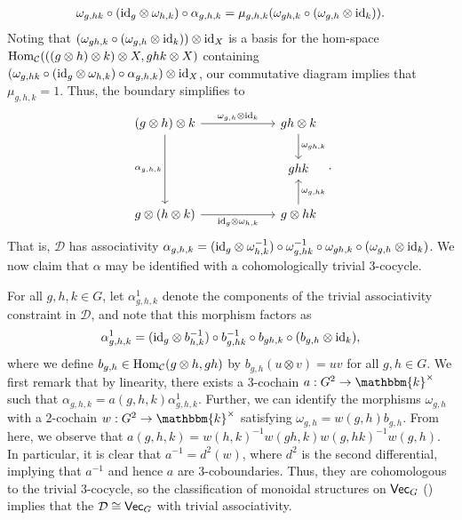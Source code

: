 \documentclass[12pt, reqno]{amsart}
\numberwithin{equation}{section}
\theoremstyle{plainspace}
\theoremstyle{definitionspace}
\theoremstyle{remarkspace}
\renewenvironment{proof}{{\noindent\textbf{Proof.}}}{\null\hfill\qedsymbol}
\newcommand{\id}{\textup{id}}
\newcommand{\mathcat}[1]{\mathcal{#1}}
\newcommand{\Hom}[2][]{
	\ifthenelse{\equal{#2}{}}
		{\textup{Hom}_{#1}}
		{\textup{Hom}_{#1}\!\left(#2\right)}
}
\newcommand{\textcat}[1]{\textup{\textsf{#1}}}
\begin{document}
\begin{proof}
\begin{align*}
\begin{split}
\omega_{g,hk} \circ (\id_g \otimes \omega_{h,k}) \circ \alpha_{g,h,k} = \mu_{g,h,k}(\omega_{gh,k} \circ (\omega_{g,h} \otimes \id_k)).
\end{split}
\end{align*}
\noindent Noting that $(\omega_{gh,k} \circ (\omega_{g,h} \otimes \id_k)) \otimes \id_X$ is a basis for the hom-space $\Hom[\mathcat{C}]{((g \otimes h) \otimes k) \otimes X, ghk \otimes X}$ containing $(\omega_{g,hk} \circ (\id_g \otimes \omega_{h,k}) \circ \alpha_{g,h,k}) \otimes \id_X$, our commutative diagram implies that $\mu_{g,h,k} = 1$. Thus, the boundary simplifies to
\begin{equation}
\begin{tikzcd}[/tikz/column 1/.style={column sep = 6.0em}, /tikz/column 2/.style={column sep = -1.0em}, row sep = 2.0em]
{(g \otimes h) \otimes k} \arrow[dd, "{\alpha_{g,h,k}}"'] \arrow[r, "{\omega_{g,h} \otimes \id_k}"] & {gh \otimes k} \arrow[d, "{\omega_{gh,k}}"] \\
& {ghk} \\
{g \otimes (h \otimes k)} \arrow[r, "{\id_g \otimes \omega_{h,k}}"'] & {g \otimes hk} \arrow[u, "{\omega_{g,hk}}"']
\end{tikzcd}.
\label{eq:near-group_cohomology}
\end{equation}
\noindent That is, $\mathcat{D}$ has associativity $\alpha_{g,h,k} = (\id_g \otimes \omega_{h,k}^{-1}) \circ \omega_{g,hk}^{-1} \circ \omega_{gh,k} \circ (\omega_{g,h} \otimes \id_k)$. We now claim that $\alpha$ may be identified with a cohomologically trivial 3-cocycle.
\newline

\noindent For all $g, h, k \in G$, let $\alpha_{g,h,k}^{1}$ denote the components of the trivial associativity constraint in $\mathcat{D}$, and note that this morphism factors as
\begin{align*}
\begin{split}
\alpha_{g,h,k}^{1} = (\id_g \otimes b_{h,k}^{-1}) \circ b_{g,hk}^{-1} \circ b_{gh,k} \circ (b_{g,h} \otimes \id_k),
\end{split}
\end{align*}
where we define $b_{g,h} \in \Hom[\mathcat{C}]{g \otimes h, gh}$ by $b_{g,h}(u \otimes v) = uv$ for all $g, h \in G$. We first remark that by linearity, there exists a 3-cochain $a : G^2 \to \mathbbm{k}^{\times}$ such that $\alpha_{g,h,k} = a(g, h, k)\alpha_{g,h,k}^{1}$. Further, we can identify the morphisms $\omega_{g,h}$ with a 2-cochain $w : G^2 \to \mathbbm{k}^{\times}$ satisfying $\omega_{g,h} = w(g, h)b_{g,h}$. From here, we observe that $a(g, h, k) = w(h, k)^{-1}w(gh, k)w(g, hk)^{-1}w(g, h)$. In particular, it is clear that $a^{-1} = d^2(w)$, where $d^2$ is the second differential, implying that $a^{-1}$ and hence $a$ are 3-coboundaries. Thus, they are cohomologous to the trivial 3-cocycle, so the classification of monoidal structures on $\textcat{Vec}_G$ (\cite[Proposition 2.6.1]{Etingof_2016}) implies that the $\mathcat{D} \cong \textcat{Vec}_G$ with trivial associativity.
\end{proof}
\newline
\end{document}
